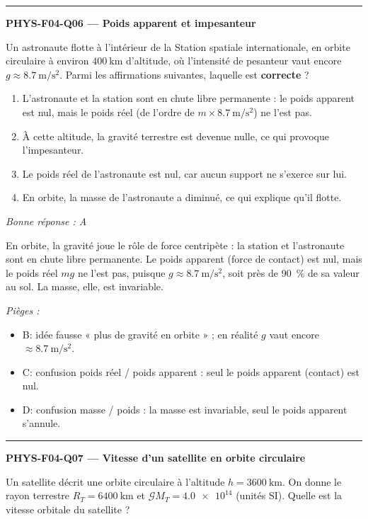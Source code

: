 \documentclass[11pt,a4paper]{article}
\begin{document}
\vspace{8pt}\hrule\vspace{8pt}
\noindent\textbf{PHYS-F04-Q06 --- Poids apparent et impesanteur}\par
Un astronaute flotte à l'intérieur de la Station spatiale internationale, en orbite circulaire à environ $\qty{400}{\kilo\metre}$ d'altitude, où l'intensité de pesanteur vaut encore $g\approx\qty{8.7}{\metre\per\second\squared}$. Parmi les affirmations suivantes, laquelle est \textbf{correcte} ?
\begin{enumerate}[label=\Alph*)]
\item L'astronaute et la station sont en chute libre permanente : le poids apparent est nul, mais le poids réel (de l'ordre de $m\times\qty{8.7}{\metre\per\second\squared}$) ne l'est pas.
\item À cette altitude, la gravité terrestre est devenue nulle, ce qui provoque l'impesanteur.
\item Le poids réel de l'astronaute est nul, car aucun support ne s'exerce sur lui.
\item En orbite, la masse de l'astronaute a diminué, ce qui explique qu'il flotte.
\end{enumerate}
\textit{Bonne réponse : A}\par
En orbite, la gravité joue le rôle de force centripète : la station et l'astronaute sont en chute libre permanente. Le poids apparent (force de contact) est nul, mais le poids réel $mg$ ne l'est pas, puisque $g\approx\qty{8.7}{\metre\per\second\squared}$, soit près de \qty{90}{\percent} de sa valeur au sol. La masse, elle, est invariable.\par
\textit{Pièges :}
\begin{itemize}
\item B: idée fausse « plus de gravité en orbite » ; en réalité $g$ vaut encore $\approx\qty{8.7}{\metre\per\second\squared}$.
\item C: confusion poids réel / poids apparent : seul le poids apparent (contact) est nul.
\item D: confusion masse / poids : la masse est invariable, seul le poids apparent s'annule.
\end{itemize}
\vspace{8pt}\hrule\vspace{8pt}
\noindent\textbf{PHYS-F04-Q07 --- Vitesse d'un satellite en orbite circulaire}\par
Un satellite décrit une orbite circulaire à l'altitude $h=\qty{3600}{\kilo\metre}$. On donne le rayon terrestre $R_T=\qty{6400}{\kilo\metre}$ et $\mathcal{G}M_T=\num{4.0e14}$ (unités SI). Quelle est la vitesse orbitale du satellite ?
\end{document}
